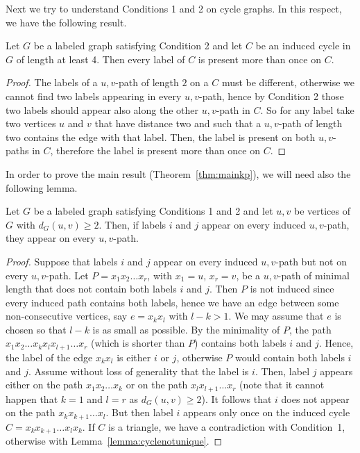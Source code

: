 \documentclass[12pt,a4paper,titlepage,openany]{report}
\begin{document}
Next we try to understand Conditions 1 and 2 on cycle graphs. In this respect, we have the following result.

\begin{lemma}\label{lemma:cyclenotunique}Let $G$ be a labeled graph satisfying Condition 2 and let $C$ be an induced cycle in $G$ of length at least 4. Then every label of $C$ is present more than once on $C$.
\end{lemma}
\begin{proof}
The labels of a $u, v$-path of length $2$ on a $C$ must be different, otherwise we cannot find two labels appearing in every $u,v$-path, hence by Condition 2 those two labels should appear also along the other $u,v$-path in $C$. So for any label take two vertices $u$ and $v$ that have distance two and such that a $u,v$-path of length two contains the edge with that label. Then, the label is present on both $u,v$-paths in $C$, therefore the label is present more than once on $C$.
\end{proof}

In order to prove the main result (Theorem~\ref{thm:mainkp}), we will need also the following lemma.

\begin{lemma}\label{lemma:inducedpaths}Let $G$ be a labeled graph satisfying Conditions 1 and 2 and let $u, v$ be vertices of $G$ with $d_G(u,v)\geq 2$. Then, if labels $i$ and $j$ appear on every induced $u, v$-path, they appear on every $u, v$-path.
\end{lemma}
\begin{proof}
Suppose that labels $i$ and $j$ appear on every induced \textsc{$u, v$}-path but not on every $u, v$-path. Let $P=x_1x_2\ldots x_r$, with $x_1=u$, $x_r=v$, be a $u, v$-path of minimal length that does not contain both labels $i$ and $j$. Then $P$ is not induced since every induced path contains both labels, hence we have an edge between some non-consecutive vertices, say $e=x_kx_l$ with $l-k>1$. We may assume that $e$ is chosen so that $l-k$ is as small as possible. By the minimality of $P$, the path $x_1x_2\ldots x_kx_lx_{l+1}\ldots x_r$ (which is shorter than $P$) contains both labels $i$ and $j$. Hence, the label of the edge $x_kx_l$ is either $i$ or $j$, otherwise $P$ would contain both labels $i$ and $j$. Assume without loss of generality that the label is $i$. Then, label $j$ appears either on the path $x_1x_2\ldots x_k$ or on the path $x_lx_{l+1}\ldots x_r$ (note that it cannot happen that $k=1$ and $l=r$ as $d_G(u,v)\geq 2$). It follows that $i$ does not appear on the path $x_kx_{k+1}\ldots x_l$. But then label $i$ appears only once on the induced cycle $C=x_kx_{k+1}\ldots x_lx_k$. If $C$ is a triangle, we have a contradiction with Condition~1, otherwise with Lemma~\ref{lemma:cyclenotunique}.
\end{proof}
\end{document}
